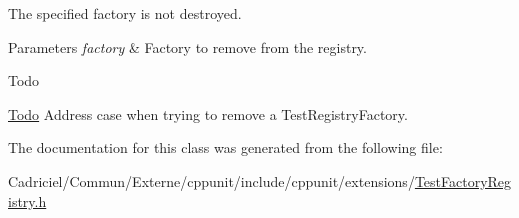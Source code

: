 The specified factory is not destroyed. 
\begin{DoxyParams}{Parameters}
{\em factory} & Factory to remove from the registry. \\
\hline
\end{DoxyParams}
\begin{DoxyRefDesc}{Todo}
\item[\hyperlink{todo__todo000001}{Todo}]Address case when trying to remove a Test\-Registry\-Factory. \end{DoxyRefDesc}


The documentation for this class was generated from the following file\-:\begin{DoxyCompactItemize}
\item 
Cadriciel/\-Commun/\-Externe/cppunit/include/cppunit/extensions/\hyperlink{_test_factory_registry_8h}{Test\-Factory\-Registry.\-h}\end{DoxyCompactItemize}
